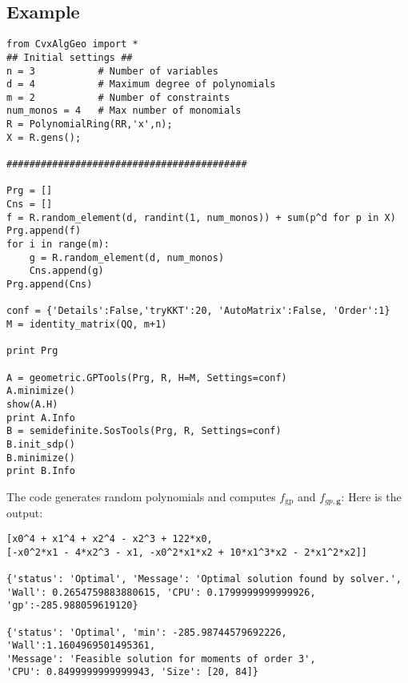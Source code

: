 \documentclass{amsart}
\theoremstyle{definition}
\newcommand{\rgp}[1]{#1_{\textrm{gp}}}
\begin{document}
\subsection{Example}
\begin{verbatim}
from CvxAlgGeo import *
## Initial settings ##
n = 3			# Number of variables
d = 4			# Maximum degree of polynomials
m = 2			# Number of constraints
num_monos = 4	# Max number of monomials
R = PolynomialRing(RR,'x',n);
X = R.gens();

##########################################

Prg = []
Cns = []
f = R.random_element(d, randint(1, num_monos)) + sum(p^d for p in X)
Prg.append(f)
for i in range(m):
    g = R.random_element(d, num_monos)
    Cns.append(g)
Prg.append(Cns)

conf = {'Details':False,'tryKKT':20, 'AutoMatrix':False, 'Order':1}
M = identity_matrix(QQ, m+1)

print Prg

A = geometric.GPTools(Prg, R, H=M, Settings=conf)
A.minimize()
show(A.H)
print A.Info
B = semidefinite.SosTools(Prg, R, Settings=conf)
B.init_sdp()
B.minimize()
print B.Info
\end{verbatim}
The code generates random polynomials and computes $\rgp{f}$ and $f_{gp,\textbf{g}}$: Here is the output:
\begin{verbatim}
[x0^4 + x1^4 + x2^4 - x2^3 + 122*x0, 
[-x0^2*x1 - 4*x2^3 - x1, -x0^2*x1*x2 + 10*x1^3*x2 - 2*x1^2*x2]]

{'status': 'Optimal', 'Message': 'Optimal solution found by solver.', 
'Wall': 0.2654759883880615, 'CPU': 0.1799999999999926, 'gp':-285.988059619120}

{'status': 'Optimal', 'min': -285.98744579692226, 'Wall':1.1604969501495361, 
'Message': 'Feasible solution for moments of order 3', 
'CPU': 0.8499999999999943, 'Size': [20, 84]}
\end{verbatim}
\end{document}
